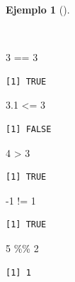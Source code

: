 \documentclass[
  spanish,
  a4paper,
]{scrreport}
\newenvironment{Shaded}{\begin{snugshade}}{\end{snugshade}}
\newcommand{\DecValTok}[1]{\textcolor[rgb]{0.68,0.00,0.00}{#1}}
\newcommand{\FloatTok}[1]{\textcolor[rgb]{0.68,0.00,0.00}{#1}}
\newcommand{\SpecialCharTok}[1]{\textcolor[rgb]{0.37,0.37,0.37}{#1}}
\theoremstyle{definition}
\theoremstyle{definition}
\newtheorem{example}{Ejemplo}[chapter]
\theoremstyle{remark}
\begin{document}
\begin{example}[]\protect\hypertarget{exm-operadores-relacionales}{}\label{exm-operadores-relacionales}

~

\begin{Shaded}
\begin{Highlighting}[]
\DecValTok{3} \SpecialCharTok{==} \DecValTok{3}
\end{Highlighting}
\end{Shaded}

\begin{verbatim}
[1] TRUE
\end{verbatim}

\begin{Shaded}
\begin{Highlighting}[]
\FloatTok{3.1} \SpecialCharTok{\textless{}=} \DecValTok{3}
\end{Highlighting}
\end{Shaded}

\begin{verbatim}
[1] FALSE
\end{verbatim}

\begin{Shaded}
\begin{Highlighting}[]
\DecValTok{4} \SpecialCharTok{\textgreater{}} \DecValTok{3}
\end{Highlighting}
\end{Shaded}

\begin{verbatim}
[1] TRUE
\end{verbatim}

\begin{Shaded}
\begin{Highlighting}[]
\SpecialCharTok{{-}}\DecValTok{1} \SpecialCharTok{!=} \DecValTok{1}
\end{Highlighting}
\end{Shaded}

\begin{verbatim}
[1] TRUE
\end{verbatim}

\begin{Shaded}
\begin{Highlighting}[]
\DecValTok{5} \SpecialCharTok{\%\%} \DecValTok{2}
\end{Highlighting}
\end{Shaded}

\begin{verbatim}
[1] 1
\end{verbatim}


\end{example}
\end{document}
